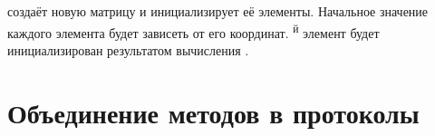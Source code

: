 \documentclass[a4paper,10pt,twoside]{book}
\begin{document}
{%
 создаёт новую матрицу  и инициализирует её элементы. Начальное значение каждого элемента будет зависеть от его координат. \textsuperscript{й} элемент будет инициализирован результатом вычисления .





\section{Объединение методов в протоколы}

}
\end{document}

